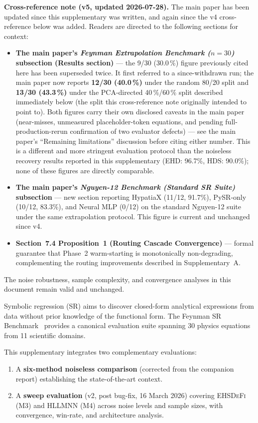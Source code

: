 \documentclass[twoside,11pt]{article}
\newcommand{\EHD}{\textsc{EHSDeFi}}
\newcommand{\HSL}{\textsc{HLLMNN}}
\begin{document}
\medskip
\noindent\textbf{Cross-reference note (v5, updated 2026-07-28).}
The main paper has been updated since this supplementary was written, and
again since the v4 cross-reference below was added. Readers are directed
to the following sections for context:
\begin{itemize}
  \item \textbf{The main paper's \emph{Feynman Extrapolation Benchmark ($n=30$)} subsection (Results section)} --- the
    9/30 (30.0\,\%) figure previously cited here has been superseded twice.
    It first referred to a since-withdrawn run; the main paper now reports
    \textbf{12/30 (40.0\,\%)} under the random 80/20 split and
    \textbf{13/30 (43.3\,\%)} under the PCA-directed 40\,\%/60\,\% split
    described immediately below (the split this cross-reference note
    originally intended to point to). Both figures carry their own
    disclosed caveats in the main paper (near-misses, unmeasured
    placeholder-token equations, and pending full-production-rerun
    confirmation of two evaluator defects) --- see the main paper's
    ``Remaining limitations'' discussion before citing either number.
    This is a different and more stringent evaluation protocol
    than the noiseless recovery results reported in this supplementary
    (EHD: 96.7\%, HDS: 90.0\%); none of these figures are directly comparable.
  \item \textbf{The main paper's \emph{Nguyen-12 Benchmark (Standard SR Suite)} subsection} --- new section reporting
    HypatiaX (11/12, 91.7\%), PySR-only (10/12, 83.3\%), and Neural MLP
    (0/12) on the standard Nguyen-12 suite under the same extrapolation
    protocol. This figure is current and unchanged since v4.
  \item \textbf{Section~7.4 Proposition~1 (Routing Cascade Convergence)} --- formal
    guarantee that Phase~2 warm-starting is monotonically non-degrading,
    complementing the routing improvements described in Supplementary~A.
\end{itemize}
The noise robustness, sample complexity, and convergence analyses in this
document remain valid and unchanged.

Symbolic regression (SR) aims to discover closed-form analytical expressions
from data without prior knowledge of the functional form.  The Feynman SR
Benchmark~\citep{udrescu2020ai} provides a canonical evaluation suite spanning
30 physics equations from 11 scientific domains.

This supplementary integrates two complementary evaluations:
\begin{enumerate}
  \item A \textbf{six-method noiseless comparison} (corrected from the
    companion report) establishing the state-of-the-art context.
  \item A \textbf{sweep evaluation} (v2, post bug-fix, 16 March 2026)
    covering \EHD{} (M3) and \HSL{} (M4) across noise levels and sample
    sizes, with convergence, win-rate, and architecture analysis.
\end{enumerate}
\end{document}
